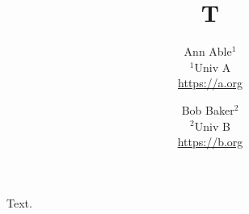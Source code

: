 \documentclass{article}
\title{T}
\author{Ann Able$^1$ \\ $^1$Univ A \\ \url{https://a.org} \and Bob Baker$^2$ \\ $^2$Univ B \\ \url{https://b.org}}
\begin{document}
\maketitle
Text.
\end{document}
